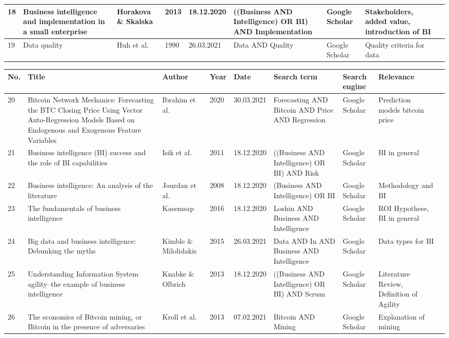 \begin{table}[H]
\begin{tabularx}{\textwidth}[ht]{|l|X|X|l|l|X|l|X|X|}
		\hline
		18 & Business intelligence and implementation in a small enterprise & Horakova \& Skalska & 2013 & 18.12.2020 & ((Business AND Intelligence) OR BI) AND Implementation & Google Scholar & Stakeholders, added value, introduction of BI \\
		\hline
		19 & Data quality & Huh et al. & 1990 & 26.03.2021 & Data AND Quality & Google Scholar & Quality criteria for data \\
		\hline
  	\end{tabularx}
\end{table}

\begin{table}[H]
	\scriptsize
  	\begin{tabularx}{\textwidth}[ht]{|l|X|X|l|l|X|l|X|X|}
		\hline
		\textbf{No.} & \textbf{Title} & \textbf{Author} & \textbf{Year} & \textbf{Date} & \textbf{Search term} & \textbf{Search engine} & \textbf{Relevance} \\
		\hline\hline
		20 & Bitcoin Network Mechanics: Forecasting the BTC Closing Price Using Vector Auto-Regression Models Based on Endogenous and Exogenous Feature Variables & Ibrahim et al. & 2020 & 30.03.2021 & Forecasting AND Bitcoin AND Price AND Regression & Google Scholar & Prediction models bitcoin price \\
		\hline
		21 & Business intelligence (BI) success and the role of BI capabilities & Isik et al. & 2011 & 18.12.2020 & ((Business AND Intelligence) OR BI) AND Risk & Google Scholar & BI in general \\
		\hline
		22 & Business intelligence: An analysis of the literature & Jourdan et al. & 2008 & 18.12.2020 & (Business AND Intelligence) OR BI & Google Scholar & Methodology and BI \\
		\hline
		23 & The fundamentals of business intelligence & Kasemsap & 2016 & 18.12.2020 & Loshin AND Business AND Intelligence & Google Scholar & ROI Hypothese, BI in general \\
		\hline
		24 & Big data and business intelligence: Debunking the myths & Kimble \& Milolidakis & 2015 & 26.03.2021 & Data AND In AND Business AND Intelligence & Google Scholar & Data types for BI \\
		\hline
		25 & Understanding Information System agility--the example of business intelligence & Knabke \& Olbrich & 2013 & 18.12.2020 & ((Business AND Intelligence) OR BI) AND Scrum & Google Scholar & Literature Review, Definition of Agility \\
		\hline
		26 & The economics of Bitcoin mining, or Bitcoin in the presence of adversaries & Kroll et al. & 2013 & 07.02.2021 & Bitcoin AND Mining & Google Scholar & Explanation of mining \\

\end{tabularx}
\end{table}
